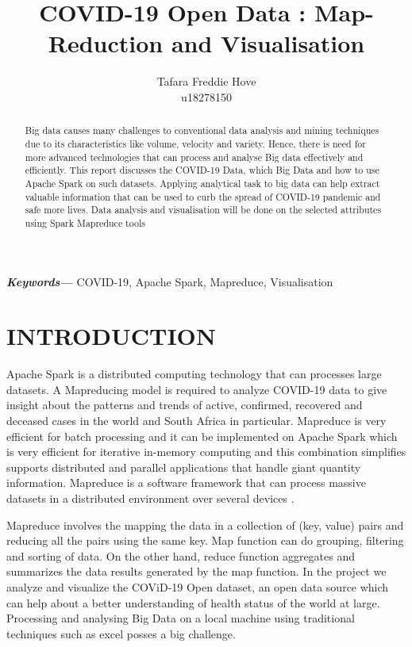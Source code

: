 \documentclass[12pt,letterpaper, twoside]{article}
\title{COVID-19 Open Data : Map-Reduction and Visualisation}
\author{Tafara Freddie Hove \\
        \small u18278150 \\
}
\date{}
\providecommand{\keywords}[1]
{
  \small	
  \textbf{\textit{Keywords---}} #1 
}
\begin{document}
\maketitle
\begin{abstract}


Big data  causes many challenges to conventional data analysis and mining  techniques due to its characteristics like volume, velocity and variety. Hence, there is need for more advanced technologies that can process and analyse Big data  effectively and efficiently. This report discusses the COVID-19 Data, which Big Data and how  to use Apache Spark on such datasets. Applying analytical task to big data can help extract valuable information that can be used to curb the spread of COVID-19  pandemic and safe more lives. Data analysis and visualisation will be done on the selected attributes using Spark Mapreduce tools



\end{abstract}\hspace{10pt}
\keywords{COVID-19, Apache Spark, Mapreduce, Visualisation}

\section{INTRODUCTION}
Apache Spark is a distributed computing  technology that can processes large datasets. A Mapreducing model is required to analyze COVID-19 data to give insight about the patterns and trends of active, confirmed, recovered and deceased cases in the world and South Africa in particular. Mapreduce is very efficient for batch processing and it can be implemented on Apache Spark which is very efficient for iterative in-memory computing and this combination simplifies supports distributed and parallel applications that handle giant quantity information. Mapreduce is a software framework  that can process massive datasets in a distributed environment over several devices \cite{}. 

 Mapreduce involves the mapping the data in a collection of (key, value) pairs and reducing all the pairs using the same key. Map function can do grouping, filtering and sorting of data. On the other hand, reduce function aggregates and summarizes the data results generated by the map function. In the project we analyze and visualize the COViD-19 Open dataset, an open data source  which can help about a better understanding of health status of the world at large. Processing and analysing Big Data on a local machine using traditional techniques such as excel posses a big challenge.
 
\end{document}
